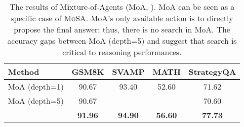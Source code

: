 \begin{table*}[t]
\caption{
The results of Mixture-of-Agents (MoA, \citet{moa}). MoA can be seen as a specific case of \textsc{MoSA}.
MoA's only available action is to directly propose the final answer; thus, there is no search in MoA.
The accuracy gaps between MoA (depth=5) and \ourmethod{} suggest that search is critical to reasoning performances.
}
\label{tab:moa}
\vskip 0.15in
\begin{center}
\begin{tabular}{lcccc}
\toprule
Method & GSM8K & SVAMP & MATH & StrategyQA \\
\midrule
MoA (depth=1) & 90.67 & 93.40 & 52.60 & 71.62 \\
MoA (depth=5) & 90.67 &  &  & 70.60 \\
\ourmethod{} &  \textbf{91.96} &  \textbf{94.90} &  \textbf{56.60} &  \textbf{77.73}  \\
\bottomrule
\end{tabular}
\end{center}
\vskip -0.1in
\end{table*}
